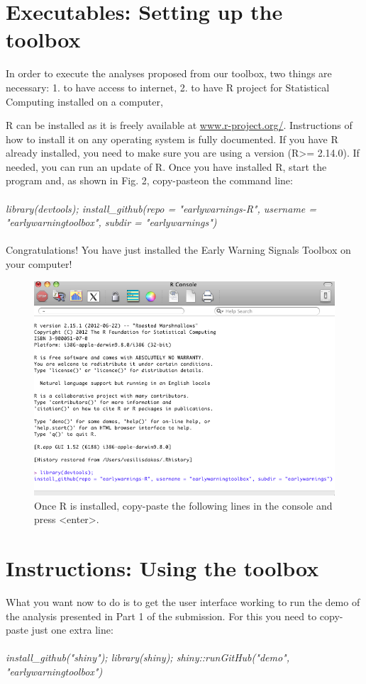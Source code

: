 \documentclass[12pt,a4paper,final]{article}
\begin{document}
\begin{doublespacing}
\section{Executables: Setting up the toolbox}
In order to execute the analyses proposed from our toolbox, two things are necessary:
1. to have access to internet,
2. to have R project for Statistical Computing installed on a computer,

R can be installed as it is freely available at \url{www.r-project.org/}. Instructions of how to install it on any operating system is fully documented. If you have R already installed, you need to make sure you are using a version (R>= 2.14.0). If needed, you can run an update of R.
Once you have installed R, start the program and, as shown in Fig. 2, copy-pasteon the command line:\\
\\
\textit{library(devtools); install\_github(repo = "earlywarnings-R", username = "earlywarningtoolbox", subdir = "earlywarnings")}\\
\\
Congratulations! You have just installed the Early Warning Signals Toolbox on your computer!

\begin{figure}[ht]
\begin{center}
\includegraphics[scale=0.5]{R_install_ews.png}
\caption{Once R is installed, copy-paste the following lines in the console and press <enter>.}
\end{center}
\end{figure}

\section{Instructions: Using the toolbox}
What you want now to do is to get the user interface working to run the demo of the analysis presented in Part 1 of the submission. For this you need to copy-paste just one extra line:\\
\\
\textit{install\_github("shiny"); library(shiny); shiny::runGitHub("demo", "earlywarningtoolbox")}


\end{doublespacing}
\end{document}
